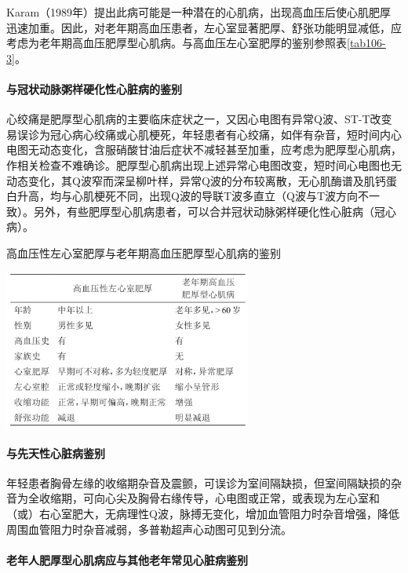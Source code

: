 Karam（1989年）提出此病可能是一种潜在的心肌病，出现高血压后使心肌肥厚迅速加重。因此，对老年期高血压患者，左心室显著肥厚、舒张功能明显减低，应考虑为老年期高血压肥厚型心肌病。与高血压左心室肥厚的鉴别参照表\ref{tab106-3}。

\paragraph{与冠状动脉粥样硬化性心脏病的鉴别}

心绞痛是肥厚型心肌病的主要临床症状之一，又因心电图有异常Q波、ST-T改变易误诊为冠心病心绞痛或心肌梗死，年轻患者有心绞痛，如伴有杂音，短时间内心电图无动态变化，含服硝酸甘油后症状不减轻甚至加重，应考虑为肥厚型心肌病，作相关检查不难确诊。肥厚型心肌病出现上述异常心电图改变，短时间心电图也无动态变化，其Q波窄而深呈柳叶样，异常Q波的分布较离散，无心肌酶谱及肌钙蛋白升高，均与心肌梗死不同，出现Q波的导联T波多直立（Q波与T波方向不一致）。另外，有些肥厚型心肌病患者，可以合并冠状动脉粥样硬化性心脏病（冠心病）。

\begin{table}[htbp]
\centering
\caption{高血压性左心室肥厚与老年期高血压肥厚型心肌病的鉴别}
\label{tab106-3}
\includegraphics[width=3.20833in,height=2.05208in]{./images/Image00475.jpg}
\end{table}

\paragraph{与先天性心脏病鉴别}

年轻患者胸骨左缘的收缩期杂音及震颤，可误诊为室间隔缺损，但室间隔缺损的杂音为全收缩期，可向心尖及胸骨右缘传导，心电图或正常，或表现为左心室和（或）右心室肥大，无病理性Q波，脉搏无变化，增加血管阻力时杂音增强，降低周围血管阻力时杂音减弱，多普勒超声心动图可见到分流。

\paragraph{老年人肥厚型心肌病应与其他老年常见心脏病鉴别}

